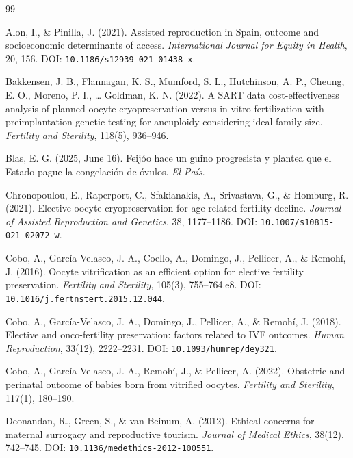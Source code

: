 \documentclass[12pt,a4paper]{article}
\begin{document}
\begin{thebibliography}{99}

Alon, I., \& Pinilla, J. (2021). Assisted reproduction in Spain,
outcome and socioeconomic determinants of access. \emph{International
Journal for Equity in Health}, 20, 156. DOI:
\nolinkurl{10.1186/s12939-021-01438-x}.

Bakkensen, J. B., Flannagan, K. S., Mumford, S. L., Hutchinson, A. P.,
Cheung, E. O., Moreno, P. I., \ldots{} Goldman, K. N. (2022). A SART
data cost-effectiveness analysis of planned oocyte cryopreservation
versus in vitro fertilization with preimplantation genetic testing for
aneuploidy considering ideal family size. \emph{Fertility and Sterility},
118(5), 936--946.

Blas, E. G. (2025, June 16). Feij\'oo hace un gu\~ino progresista y
plantea que el Estado pague la congelaci\'on de \'ovulos. \emph{El
Pa\'is}.

Chronopoulou, E., Raperport, C., Sfakianakis, A., Srivastava, G., \&
Homburg, R. (2021). Elective oocyte cryopreservation for age-related
fertility decline. \emph{Journal of Assisted Reproduction and Genetics},
38, 1177--1186. DOI: \nolinkurl{10.1007/s10815-021-02072-w}.

Cobo, A., Garc\'ia-Velasco, J. A., Coello, A., Domingo, J., Pellicer,
A., \& Remoh\'i, J. (2016). Oocyte vitrification as an efficient option
for elective fertility preservation. \emph{Fertility and Sterility},
105(3), 755--764.e8. DOI:
\nolinkurl{10.1016/j.fertnstert.2015.12.044}.

Cobo, A., Garc\'ia-Velasco, J. A., Domingo, J., Pellicer, A., \&
Remoh\'i, J. (2018). Elective and onco-fertility preservation: factors
related to IVF outcomes. \emph{Human Reproduction}, 33(12), 2222--2231.
DOI: \nolinkurl{10.1093/humrep/dey321}.

Cobo, A., Garc\'ia-Velasco, J. A., Remoh\'i, J., \& Pellicer, A.
(2022). Obstetric and perinatal outcome of babies born from vitrified
oocytes. \emph{Fertility and Sterility}, 117(1), 180--190.

Deonandan, R., Green, S., \& van Beinum, A. (2012). Ethical concerns
for maternal surrogacy and reproductive tourism. \emph{Journal of
Medical Ethics}, 38(12), 742--745. DOI:
\nolinkurl{10.1136/medethics-2012-100551}.


\end{thebibliography}
\end{document}
